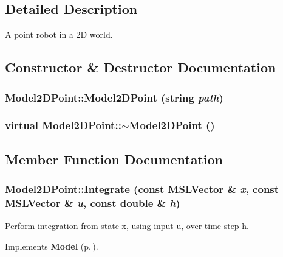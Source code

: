 \subsection{Detailed Description}
A point robot in a 2D world.



\subsection{Constructor \& Destructor Documentation}
\subsubsection{\setlength{\rightskip}{0pt plus 5cm}Model2DPoint::Model2DPoint (string {\em path})}\label{classModel2DPoint_a0}


\subsubsection{\setlength{\rightskip}{0pt plus 5cm}virtual Model2DPoint::$\sim$Model2DPoint ()\hspace{0.3cm}{\tt  [inline, virtual]}}\label{classModel2DPoint_a1}




\subsection{Member Function Documentation}
\subsubsection{ Model2DPoint::Integrate (const {\bf MSLVector} \& {\em x}, const {\bf MSLVector} \& {\em u}, const double \& {\em h})\hspace{0.3cm}{\tt  [virtual]}}\label{classModel2DPoint_a2}


Perform integration from state x, using input u, over time step h.



Implements {\bf Model} {\rm (p.\,\pageref{classModel_a5})}.

